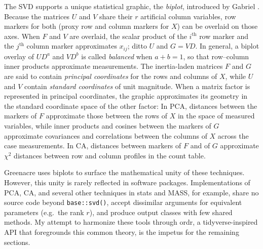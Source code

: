 \documentclass{vgtc}                          %
\newcommand{\pkg}[1]{\textsf{#1}}
\begin{document}
The SVD supports a unique statistical graphic, the \emph{biplot}, introduced by Gabriel \cite{Gabriel1971}.
Because the matrices $U$ and $V$ share their $r$ artificial column variables, row markers for both (proxy row and column markers for $X$) can be overlaid on those axes.
When $F$ and $V$ are overlaid, the scalar product of the $i^\text{th}$ row marker and the $j^\text{th}$ column marker approximates $x_{ij}$; ditto $U$ and $G = VD$.
In general, a biplot overlay of $UD^a$ and $VD^b$ is called \emph{balanced} when $a + b = 1$, so that row--column inner products approximate measurements.
The inertia-laden matrices $F$ and $G$ are said to contain \emph{principal coordinates} for the rows and columns of $X$, while $U$ and $V$ contain \emph{standard coordinates} of unit magnitude.
When a matrix factor is represented in principal coordinates, the graphic approximates its geometry in the standard coordinate space of the other factor:
In PCA, distances between the markers of $F$ approximate those between the rows of $X$ in the space of measured variables, while inner products and cosines between the markers of $G$ approximate covariances and correlations between the columns of $X$ across the case measurements.
In CA, distances between markers of $F$ and of $G$ approximate $\chi^2$ distances between row and column profiles in the count table.

Greenacre \cite{Greenacre2010} uses biplots to surface the mathematical unity of these techniques.
However, this unity is rarely reflected in software packages.
Implementations of PCA, CA, and several other techniques in \pkg{stats} and \pkg{MASS}, for example, share no source code beyond \texttt{base::svd()}, accept dissimilar arguments for equivalent parameters (e.g.~the rank $r$), and produce output classes with few shared methods.
My attempt to harmonize these tools through \pkg{ordr}, a tidyverse-inspired API that foregrounds this common theory, is the impetus for the remaining sections.
\end{document}
